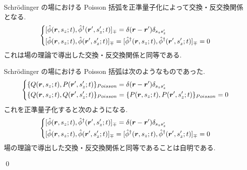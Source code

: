 \documentclass[uplatex,dvipdfmx,a4paper,11pt]{jlreq}
\makeatletter
\newcommand{\rr}{\bm{r}}
\numberwithin{equation}{section}
\theoremstyle{definition}
\renewenvironment{proof}[1][\proofname]{\par
  \normalfont
  \topsep6\p@\@plus6\p@ \trivlist
  \item[\hskip\labelsep{\bfseries #1}\@addpunct{\bfseries}]\ignorespaces\quad\par
}{
  \qed\endtrivlist\@endpefalse
}
\renewcommand\proofname{証明}
\makeatother
\begin{document}
\begin{theorem}[Q21-101(iii)(iv)]
  Schrödinger の場における Poisson 括弧を正準量子化によって交換・反交換関係となる.
  \begin{align}
    \begin{dcases}
      [\hat{\phi}(\rr, s_z; t), \hat{\phi}^\dagger(\rr', s_z'; t)]_\mp = \delta(\rr - \rr')\delta_{s_zs_z'} \\
      [\hat{\phi}(\rr, s_z; t), \hat{\phi}(\rr', s_z'; t)]_\mp = [\hat{\phi}^\dagger(\rr, s_z; t), \hat{\phi}^\dagger(\rr', s_z'; t)]_\mp = 0
    \end{dcases}
  \end{align}
  これは場の理論で導出した交換・反交換関係と同等である.
\end{theorem}
\begin{proof}
  Schrödinger の場における Poisson 括弧は次のようなものであった.
  \begin{align}
    \begin{dcases}
      \{Q(\rr, s_z; t), P(\rr', s_z'; t)\}_{Poisson} = \delta(\rr - \rr')\delta_{s_zs_z'} \\
      \{Q(\rr, s_z; t), Q(\rr', s_z'; t)\}_{Poisson} = \{P(\rr, s_z; t), P(\rr', s_z'; t)\}_{Poisson} = 0
    \end{dcases}
  \end{align}
  これを正準量子化すると次のようになる.
  \begin{align}
    \begin{dcases}
      [\hat{\phi}(\rr, s_z; t), \hat{\phi}^\dagger(\rr', s_z'; t)]_\mp = \delta(\rr - \rr')\delta_{s_zs_z'} \\
      [\hat{\phi}(\rr, s_z; t), \hat{\phi}(\rr', s_z'; t)]_\mp = [\hat{\phi}^\dagger(\rr, s_z; t), \hat{\phi}^\dagger(\rr', s_z'; t)]_\mp = 0
    \end{dcases}
  \end{align}
  場の理論で導出した交換・反交換関係と同等であることは自明である.
\end{proof}
\end{document}
